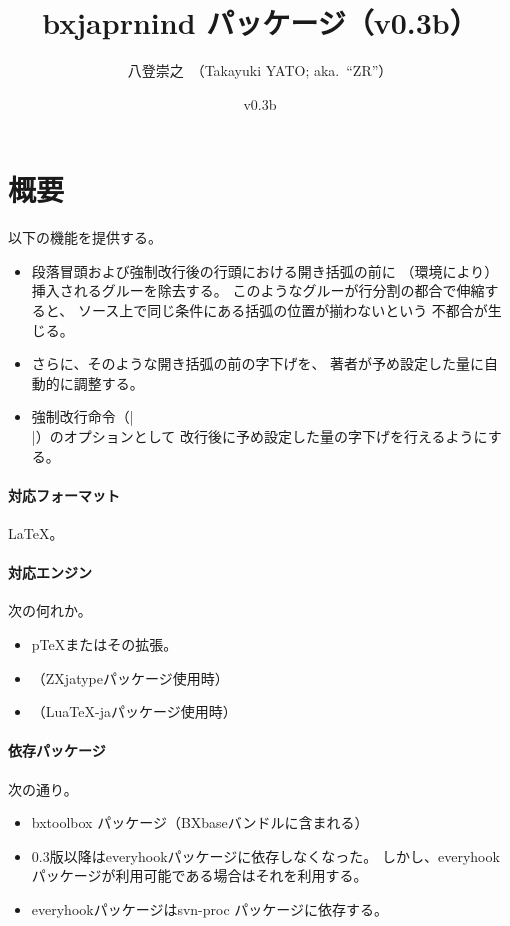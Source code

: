 \documentclass[a4paper]{ltjsarticle}
\newcommand{\PkgVersion}{0.3b}
\newcommand{\PkgDate}{2017/09/12}
\newcommand{\Pkg}[1]{\textsf{#1}}
\providecommand{\pTeX}{p\TeX}
\begin{document}
\title{\Pkg{bxjaprnind} パッケージ（v\PkgVersion）}
\author{八登崇之\ （Takayuki YATO; aka.~``ZR''）}
\date{v\PkgVersion\quad[\PkgDate]}
\maketitle

\section{概要}

以下の機能を提供する。
\begin{itemize}
\item 段落冒頭および強制改行後の行頭における開き括弧の前に
  （環境により）挿入されるグルーを除去する。
  このようなグルーが行分割の都合で伸縮すると、
  ソース上で同じ条件にある括弧の位置が揃わないという
  不都合が生じる。
\item さらに、そのような開き括弧の前の字下げを、
  著者が予め設定した量に自動的に調整する。
\item 強制改行命令（|\\|）のオプションとして
  改行後に予め設定した量の字下げを行えるようにする。
\end{itemize}

\paragraph{対応フォーマット} \LaTeX。

\paragraph{対応エンジン} 次の何れか。
\begin{itemize}
\item {\pTeX}またはその拡張。
\item {\XeTeX}（\Pkg{ZXjatype}パッケージ使用時）
\item {\LuaTeX}（\Pkg{LuaTeX-ja}パッケージ使用時）
\end{itemize}

\paragraph{依存パッケージ} 次の通り。
\begin{itemize}
\item \Pkg{bxtoolbox} パッケージ（\Pkg{BXbase}バンドルに含まれる）
\item 0.3版以降は\Pkg{everyhook}パッケージに依存しなくなった。
しかし、\Pkg{everyhook}パッケージが利用可能である場合はそれを利用する。
\item \Pkg{everyhook}パッケージは\Pkg{svn-proc} パッケージに依存する。
\end{itemize}
\end{document}
